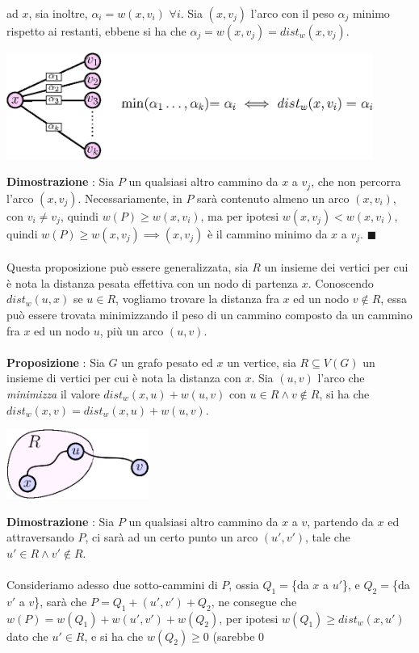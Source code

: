 \documentclass[12pt, letterpaper]{article}
\newcommand{\acc}{\\\hphantom{}\\}
\begin{document}
ad $x$, sia inoltre, $\alpha_i=w(x,v_i)$ $\forall i$. Sia $(x,v_j)$ l'arco con il peso $\alpha_j$ minimo rispetto
ai restanti, ebbene si ha che $\alpha_j=w(x,v_j)=dist_w(x,v_j)$. \begin{center}
    \includegraphics[width=0.9\textwidth ]{images/distNodiVicini.eps}
\end{center}
\textbf{Dimostrazione} : Sia $P$ un qualsiasi altro cammino da $x$ a $v_j$, che non percorra l'arco
$(x,v_j)$. Necessariamente, in $P$ sarà contenuto almeno un arco $(x,v_i)$, con $v_i\ne v_j$, quindi
$w(P)\ge w(x,v_i)$, ma per ipotesi $w(x,v_j)<w(x,v_i)$, quindi $w(P)\ge w(x,v_j)\implies(x,v_j)$ è il cammino minimo
da $x$ a $v_j$. $\blacksquare$\acc
Questa proposizione può essere generalizzata, sia $R$ un insieme dei vertici per cui è nota la distanza pesata effettiva con un
nodo di partenza $x$. Conoscendo $dist_w(u,x)$ se $u\in R$, vogliamo trovare la distanza fra $x$ ed un nodo $v\notin R$,
essa può essere trovata minimizzando il peso di un cammino composto da un cammino fra $x$ ed un nodo $u$, più un arco
$(u,v)$.\acc
\textbf{Proposizione} : Sia $G$ un grafo pesato ed $x$ un vertice, sia $R\subseteq V(G)$ un insieme di vertici per cui
è nota la distanza con $x$. Sia $(u,v)$ l'arco che \textit{minimizza} il valore $dist_w(x,u)+w(u,v)$ con $u\in R \land v\notin R$,
si ha che $dist_w(x,v)=dist_w(x,u)+w(u,v)$.\begin{center}
    \includegraphics[width=0.35\textwidth ]{images/insiemeR.eps}
\end{center}
\textbf{Dimostrazione} : Sia $P$ un qualsiasi altro cammino da $x$ a $v$, partendo da $x$ ed attraversando $P$, ci
sarà ad un certo punto un arco $(u',v')$, tale che $u'\in R\land v'\notin R$. \acc Consideriamo adesso due sotto-cammini di
$P$, ossia $Q_1=$\{da $x$ a $u'$\}, e $Q_2=$\{da $v'$ a $v$\}, sarà che $P=Q_1+(u',v')+Q_2$, ne consegue che
$w(P)=w(Q_1)+w(u',v')+w(Q_2)$, per ipotesi $w(Q_1)\ge dist_w(x,u')$ dato che $u'\in R$, e si ha che $w(Q_2)\ge 0$ (sarebbe 0
\end{document}
